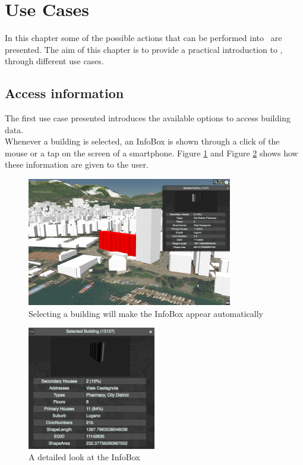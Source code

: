 \section{Use Cases} \label{useCases}
In this chapter some of the possible actions that can be performed into \applicationName\ are presented. The aim of this chapter is to provide a practical introduction to \applicationName, through different use cases.
\subsection{Access information}
The first use case presented introduces the available options to access building data.\\
Whenever a building is selected, an InfoBox is shown through a click of the mouse or a tap on the screen of a smartphone. Figure \ref{subfig:infoBox_city} and Figure \ref{subfig:infoBox} shows how these information are given to the user.\\
\begin{figure} [h]
\centering
	\includegraphics[width=0.8\textwidth]{chapter4/images/infoBox_city}
	\caption{Selecting a building will make the InfoBox appear automatically}
	\label{subfig:infoBox_city}
	\end{figure}
\begin{figure} [h]
	\centering
	\includegraphics[width=0.5\textwidth]{chapter4/images/infoBox}
	\caption{A detailed look at the InfoBox}
	\label{subfig:infoBox}
\end{figure}
